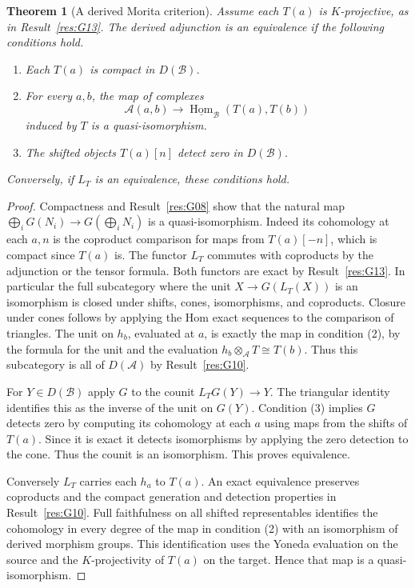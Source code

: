 \documentclass[11pt,oneside,openany]{book}
\newtheorem{theorem}{Theorem}[chapter]
\theoremstyle{definition}
\theoremstyle{remark}
\begin{document}
\begin{theorem}[A derived Morita criterion]\label{res:G14}
Assume each \(T(a)\) is \(K\)-projective, as in
Result~\ref{res:G13}. The derived adjunction is an equivalence
if the following conditions hold.
\begin{enumerate}
\item Each \(T(a)\) is compact in \(D(\mathcal B)\).
\item For every \(a,b\), the map of complexes
\[
  \mathcal A(a,b)\longrightarrow
     \underline{\operatorname{Hom}}_\mathcal B(T(a),T(b))
\]
induced by \(T\) is a quasi-isomorphism.
\item The shifted objects \(T(a)[n]\) detect zero in \(D(\mathcal B)\).
\end{enumerate}
Conversely, if \(L_T\) is an equivalence, these conditions hold.
\end{theorem}
\begin{proof}
Compactness and Result~\ref{res:G08} show that the natural map
\(\bigoplus_i G(N_i)\to G(\bigoplus_i N_i)\) is a quasi-isomorphism.
Indeed its cohomology at each \(a,n\) is the coproduct comparison
for maps from \(T(a)[-n]\), which is compact since \(T(a)\) is.
The functor \(L_T\) commutes with coproducts by the adjunction
or the tensor formula. Both functors are exact by
Result~\ref{res:G13}. In particular the full subcategory where
the unit \(X\to G(L_T(X))\) is an isomorphism is closed under
shifts, cones, isomorphisms, and coproducts. Closure under cones
follows by applying the Hom exact sequences to the comparison
of triangles. The unit on \(h_b\), evaluated at \(a\), is
exactly the map in condition (2), by the formula for the unit and
the evaluation \(h_b\otimes_\mathcal A T\cong T(b)\).
Thus this subcategory is all of \(D(\mathcal A)\) by
Result~\ref{res:G10}.

For \(Y\in D(\mathcal B)\) apply \(G\) to the counit
\(L_T G(Y)\to Y\). The triangular identity identifies this as
the inverse of the unit on \(G(Y)\). Condition (3) implies \(G\)
detects zero by computing its cohomology at each \(a\) using
maps from the shifts of \(T(a)\). Since it is exact it detects
isomorphisms by applying the zero detection to the cone.
Thus the counit is an isomorphism. This proves equivalence.

Conversely \(L_T\) carries each \(h_a\) to \(T(a)\).
An exact equivalence preserves coproducts and the compact
generation and detection properties in Result~\ref{res:G10}.
Full faithfulness on all shifted representables identifies the
cohomology in every degree of the map in condition (2) with
an isomorphism of derived morphism groups. This identification
uses the Yoneda evaluation on the source and the
\(K\)-projectivity of \(T(a)\) on the target. Hence that map is
a quasi-isomorphism.
\end{proof}
\end{document}
